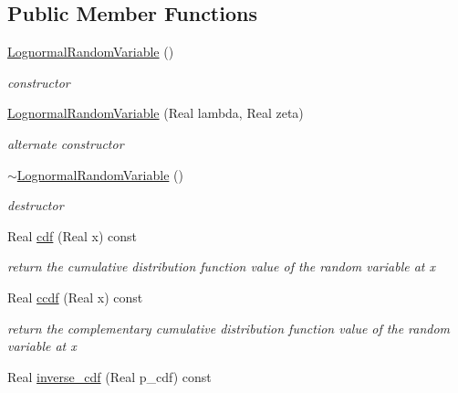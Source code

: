 \subsection*{Public Member Functions}
\begin{DoxyCompactItemize}
\item 
\hyperlink{classPecos_1_1LognormalRandomVariable_ad3294d11bef887ebfa7ef7afe8079736}{Lognormal\+Random\+Variable} ()\label{classPecos_1_1LognormalRandomVariable_ad3294d11bef887ebfa7ef7afe8079736}

\begin{DoxyCompactList}\small\item\em constructor \end{DoxyCompactList}\item 
\hyperlink{classPecos_1_1LognormalRandomVariable_a1e995a66d32583f8e824b09895694e43}{Lognormal\+Random\+Variable} (Real lambda, Real zeta)\label{classPecos_1_1LognormalRandomVariable_a1e995a66d32583f8e824b09895694e43}

\begin{DoxyCompactList}\small\item\em alternate constructor \end{DoxyCompactList}\item 
\hyperlink{classPecos_1_1LognormalRandomVariable_a207213857452540982f1067d556b58f3}{$\sim$\+Lognormal\+Random\+Variable} ()\label{classPecos_1_1LognormalRandomVariable_a207213857452540982f1067d556b58f3}

\begin{DoxyCompactList}\small\item\em destructor \end{DoxyCompactList}\item 
Real \hyperlink{classPecos_1_1LognormalRandomVariable_addd564e7f4f314e12d38df74d845f0d8}{cdf} (Real x) const \label{classPecos_1_1LognormalRandomVariable_addd564e7f4f314e12d38df74d845f0d8}

\begin{DoxyCompactList}\small\item\em return the cumulative distribution function value of the random variable at x \end{DoxyCompactList}\item 
Real \hyperlink{classPecos_1_1LognormalRandomVariable_a23c3b599e7e4788a9a5e9e93c3dbaf4d}{ccdf} (Real x) const \label{classPecos_1_1LognormalRandomVariable_a23c3b599e7e4788a9a5e9e93c3dbaf4d}

\begin{DoxyCompactList}\small\item\em return the complementary cumulative distribution function value of the random variable at x \end{DoxyCompactList}\item 
Real \hyperlink{classPecos_1_1LognormalRandomVariable_a918a1aac05ca349ea5313eebcba46c3e}{inverse\+\_\+cdf} (Real p\+\_\+cdf) const \label{classPecos_1_1LognormalRandomVariable_a918a1aac05ca349ea5313eebcba46c3e}


\end{DoxyCompactItemize}
